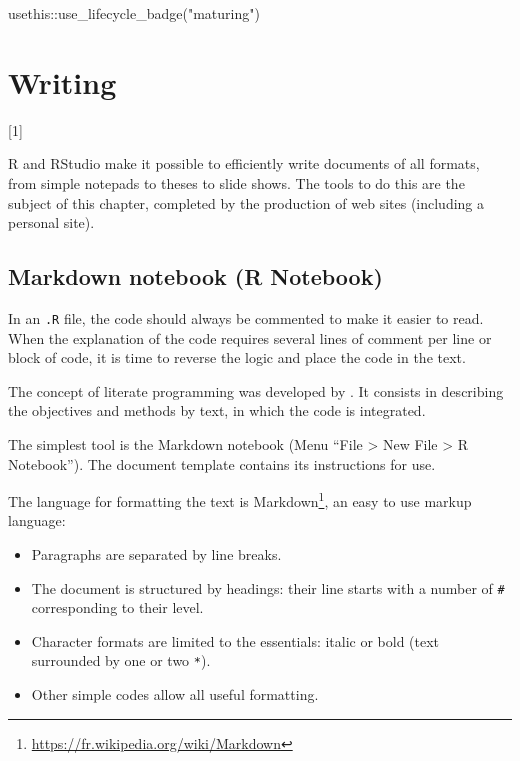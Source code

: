 \documentclass[
  12pt,
  american,
  a4paper,
  extrafontsizes,onecolumn,openright
  ]{memoir}
\newenvironment{Shaded}{\begin{snugshade}}{\end{snugshade}}
\newcommand{\FunctionTok}[1]{\textcolor[rgb]{0.00,0.00,0.00}{#1}}
\newcommand{\NormalTok}[1]{#1}
\newcommand{\SpecialCharTok}[1]{\textcolor[rgb]{0.00,0.00,0.00}{#1}}
\newcommand{\StringTok}[1]{\textcolor[rgb]{0.31,0.60,0.02}{#1}}
\providecommand{\tightlist}{%
  \setlength{\itemsep}{0pt}\setlength{\parskip}{0pt}}
\newcommand{\toc}[1]{%
  \startcontents[chapters]%
  \printcontents[chapters]{}{1}[#1]{}%
  ~\newline%
}
\begin{document}
\scriptsize

\begin{Shaded}
\begin{Highlighting}[]
\NormalTok{usethis}\SpecialCharTok{::}\FunctionTok{use\_lifecycle\_badge}\NormalTok{(}\StringTok{"maturing"}\NormalTok{)}
\end{Highlighting}
\end{Shaded}

\normalsize

\hypertarget{chap-rediger}{%
\chapter{Writing}\label{chap-rediger}}

\toc{1}

R and RStudio make it possible to efficiently write documents of all formats, from simple notepads to theses to slide shows.
The tools to do this are the subject of this chapter, completed by the production of web sites (including a personal site).

\hypertarget{markdown-notebook-r-notebook}{%
\section{Markdown notebook (R Notebook)}\label{markdown-notebook-r-notebook}}

In an \texttt{.R} file, the code should always be commented to make it easier to read.
When the explanation of the code requires several lines of comment per line or block of code, it is time to reverse the logic and place the code in the text.

The concept of literate programming was developed by \textcite{Knuth1984}.
It consists in describing the objectives and methods by text, in which the code is integrated.

The simplest tool is the Markdown notebook (Menu \enquote{File \textgreater{} New File \textgreater{} R Notebook}).
The document template contains its instructions for use.

The language for formatting the text is Markdown\footnote{\url{https://fr.wikipedia.org/wiki/Markdown}}, an easy to use markup language:

\begin{itemize}
\tightlist
\item
  Paragraphs are separated by line breaks.
\item
  The document is structured by headings: their line starts with a number of \texttt{\#} corresponding to their level.
\item
  Character formats are limited to the essentials: italic or bold (text surrounded by one or two \texttt{*}).
\item
  Other simple codes allow all useful formatting.
\end{itemize}
\end{document}

